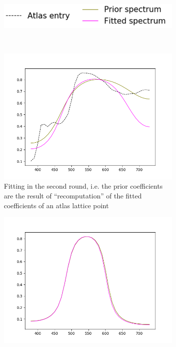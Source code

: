 \begin{figure}[t]
	\centering
	\begin{subfigure}[t]{0.4\textwidth}
		\includegraphics[width=\linewidth]{img/cost_functions_regular_legend.png}
	\end{subfigure} \\
	\begin{subfigure}[t]{0.45\textwidth}
	\includegraphics[width=\linewidth]{img/cost_functions_regular_round2.png}
	\caption{Fitting in the second round, i.e. the prior coefficients are the result of ``recomputation'' of the fitted coefficients of an atlas lattice point}
	\label{fig:costFunctionsRegularRound2}
	\end{subfigure} \hspace{0.1em}
	\begin{subfigure}[t]{0.45\textwidth}
		\includegraphics[width=\linewidth,height=0.2\textheight]{img/cost_functions_regular_round8.png}

\end{subfigure}
\end{figure}
